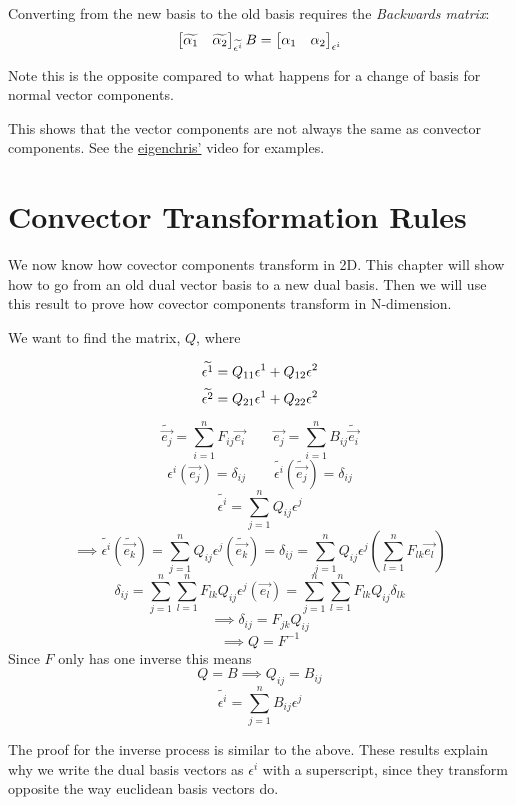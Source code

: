 \documentclass{report}
\begin{document}
Converting from the new basis to the old basis requires the \emph{Backwards matrix}:
$$ \begin{bmatrix} \widetilde{\alpha_1} & \widetilde{\alpha_2} \end{bmatrix}_{\widetilde{\epsilon^i}} B = \begin{bmatrix} \alpha_1 & \alpha_2 \end{bmatrix}_{\epsilon^i}   $$ 

Note this is the opposite compared to what happens for a change of basis for normal vector components.

This shows that the vector components are not always the same as convector components. See the \href{https://youtu.be/rG2q77qunSw?t=512}{eigenchris'} video for examples.

\chapter{Convector Transformation Rules}
We now know how covector components transform in 2D. This chapter will show how to go from an old dual vector basis to a new dual basis. Then we will use this result to prove how covector components transform in N-dimension.

We want to find the matrix, $Q$, where

$$ \widetilde{\epsilon^1} = Q_{11}\epsilon^1 + Q_{12}\epsilon^2 $$ 
$$ \widetilde{\epsilon^2} = Q_{21} \epsilon^1 + Q_{22}\epsilon^2 $$ 

\begin{myproof}
	$$ \widetilde{\vec{e_j}} = \sum_{i=1}^{n} F_{ij} \vec{e_i} \qquad \vec{e_j} = \sum_{i=1}^{n} B_{ij} \widetilde{\vec{e_i}} $$ 
	$$ \epsilon^i\left( \vec{e_j}  \right) = \delta_{ij} \qquad \widetilde{\epsilon^i}\left( \widetilde{\vec{e_j}} \right) = \delta_{ij} $$ 
	$$ \widetilde{\epsilon^i} =  \sum_{j=1}^{n} Q_{ij} \epsilon^j  $$ 
	$$ \implies  \widetilde{\epsilon^i}\left( \widetilde{\vec{e_k}} \right)=  \sum_{j=1}^{n} Q_{ij} \epsilon^j\left( \widetilde{\vec{e_k}} \right) = \delta_{ij} = \sum_{j=1}^{n} Q_{ij} \epsilon^j \left( \sum_{l=1}^{n} F_{lk}\vec{e_l} \right) $$ 
	$$ \delta_{ij} =\sum_{j=1}^{n} \sum_{l=1}^{n} F_{lk} Q_{ij} \epsilon^j \left( \vec{e_l} \right) =\sum_{j=1}^{n} \sum_{l=1}^{n} F_{lk} Q_{ij} \delta_{lk} $$ 
	$$ \implies \delta_{ij} = F_{jk} Q_{ij} $$ 
	$$ \implies Q = F^{-1} $$ 
	Since $F$ only has one inverse this means
	$$ Q = B \implies Q_{ij} = B_{ij} $$ 
	$$ \widetilde{\epsilon^i} = \sum_{j=1}^{n} B_{ij}\epsilon^j $$ 
	
\end{myproof}
The proof for the inverse process is similar to the above. These results explain why we write the dual basis vectors as $\epsilon^i$ with a superscript, since they transform opposite the way euclidean basis vectors do.
\end{document}
